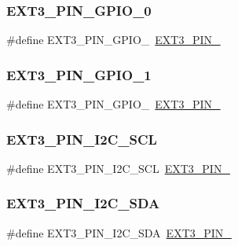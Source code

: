 \subsubsection{\texorpdfstring{EXT3\_PIN\_GPIO\_0}{EXT3\_PIN\_GPIO\_0}}
{\footnotesize\ttfamily \#define E\+X\+T3\+\_\+\+P\+I\+N\+\_\+\+G\+P\+I\+O\+\_~\mbox{\hyperlink{group__samd21__xplained__pro__features__group_gae0e882567ba8d8b65d6f02ce1c8e197b}{E\+X\+T3\+\_\+\+P\+I\+N\+\_}}}

\mbox{\label{group__samd21__xplained__pro__features__group_gaf1491d9740447373c693ce7fe36fb8c1}} 
\subsubsection{\texorpdfstring{EXT3\_PIN\_GPIO\_1}{EXT3\_PIN\_GPIO\_1}}
{\footnotesize\ttfamily \#define E\+X\+T3\+\_\+\+P\+I\+N\+\_\+\+G\+P\+I\+O\+\_~\mbox{\hyperlink{group__samd21__xplained__pro__features__group_gae585af12e54a482a9c0b560088f49961}{E\+X\+T3\+\_\+\+P\+I\+N\+\_}}}

\mbox{\label{group__samd21__xplained__pro__features__group_gaeb539fa71e7f66b780fbdee9ad4e0831}} 
\subsubsection{\texorpdfstring{EXT3\_PIN\_I2C\_SCL}{EXT3\_PIN\_I2C\_SCL}}
{\footnotesize\ttfamily \#define E\+X\+T3\+\_\+\+P\+I\+N\+\_\+\+I2\+C\+\_\+\+S\+CL~\mbox{\hyperlink{group__samd21__xplained__pro__features__group_ga7797b0ce37f1f164fbd83a7c28e85e2a}{E\+X\+T3\+\_\+\+P\+I\+N\+\_}}}

\mbox{\label{group__samd21__xplained__pro__features__group_gaabe527bdf7b57f8bb6f62a8a539db093}} 
\subsubsection{\texorpdfstring{EXT3\_PIN\_I2C\_SDA}{EXT3\_PIN\_I2C\_SDA}}
{\footnotesize\ttfamily \#define E\+X\+T3\+\_\+\+P\+I\+N\+\_\+\+I2\+C\+\_\+\+S\+DA~\mbox{\hyperlink{group__samd21__xplained__pro__features__group_ga3ff8ac1a1d17200f4cc8ca790dfb3f06}{E\+X\+T3\+\_\+\+P\+I\+N\+\_}}}

